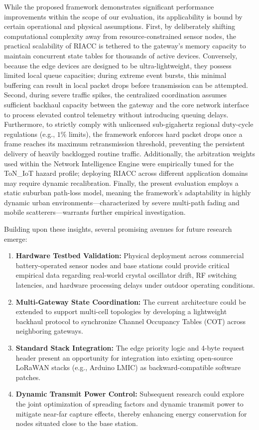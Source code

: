 \documentclass[preprint,review,12pt]{elsarticle}
\begin{document}
While the proposed framework demonstrates significant performance improvements within the scope of our evaluation, its applicability is bound by certain operational and physical assumptions. First, by deliberately shifting computational complexity away from resource-constrained sensor nodes, the practical scalability of RIACC is tethered to the gateway's memory capacity to maintain concurrent state tables for thousands of active devices. Conversely, because the edge devices are designed to be ultra-lightweight, they possess limited local queue capacities; during extreme event bursts, this minimal buffering can result in local packet drops before transmission can be attempted. Second, during severe traffic spikes, the centralized coordination assumes sufficient backhaul capacity between the gateway and the core network interface to process elevated control telemetry without introducing queuing delays. Furthermore, to strictly comply with unlicensed sub-gigahertz regional duty-cycle regulations (e.g., $1\%$ limits), the framework enforces hard packet drops once a frame reaches its maximum retransmission threshold, preventing the persistent delivery of heavily backlogged routine traffic. Additionally, the arbitration weights used within the Network Intelligence Engine were empirically tuned for the ToN\_IoT hazard profile; deploying RIACC across different application domains may require dynamic recalibration. Finally, the present evaluation employs a static suburban path-loss model, meaning the framework's adaptability in highly dynamic urban environments—characterized by severe multi-path fading and mobile scatterers—warrants further empirical investigation.

Building upon these insights, several promising avenues for future research emerge:
\begin{enumerate}
    \item \textbf{Hardware Testbed Validation:} Physical deployment across commercial battery-operated sensor nodes and base stations could provide critical empirical data regarding real-world crystal oscillator drift, RF switching latencies, and hardware processing delays under outdoor operating conditions.
    \item \textbf{Multi-Gateway State Coordination:} The current architecture could be extended to support multi-cell topologies by developing a lightweight backhaul protocol to synchronize Channel Occupancy Tables (COT) across neighboring gateways.
    \item \textbf{Standard Stack Integration:} The edge priority logic and 4-byte request header present an opportunity for integration into existing open-source LoRaWAN stacks (e.g., Arduino LMIC) as backward-compatible software patches.
    \item \textbf{Dynamic Transmit Power Control:} Subsequent research could explore the joint optimization of spreading factors and dynamic transmit power to mitigate near-far capture effects, thereby enhancing energy conservation for nodes situated close to the base station.
\end{enumerate}
\end{document}
